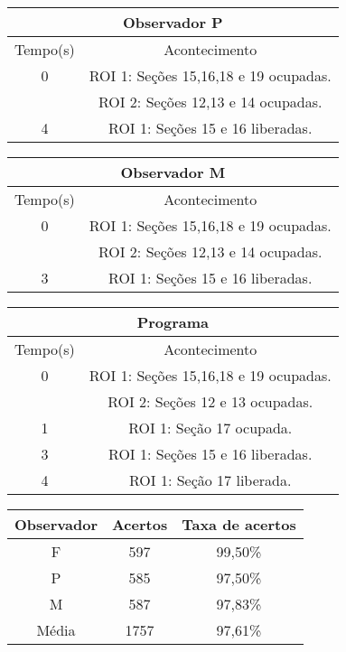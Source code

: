 \begin{center}
\begin{tabular}{|c||c|}
\hline
\multicolumn{2}{|c|}{Observador P}  \\ \hline \hline
Tempo(s) & Acontecimento \\ \hline
0 & ROI 1: Seções 15,16,18 e 19 ocupadas. \\
 & ROI 2: Seções 12,13 e 14 ocupadas. \\ \hline
4 & ROI 1: Seções 15 e 16 liberadas. \\
\hline
\end{tabular}
\end{center}

\begin{center}
\begin{tabular}{|c||c|}
\hline
\multicolumn{2}{|c|}{Observador M}  \\ \hline \hline
Tempo(s) & Acontecimento \\ \hline
0 & ROI 1: Seções 15,16,18 e 19 ocupadas. \\
 & ROI 2: Seções 12,13 e 14 ocupadas. \\ \hline
3 & ROI 1: Seções 15 e 16 liberadas. \\
\hline
\end{tabular}
\end{center}

\begin{center}
\begin{tabular}{|c||c|}
\hline
\multicolumn{2}{|c|}{Programa}  \\ \hline \hline
Tempo(s) & Acontecimento \\ \hline
0 & ROI 1: Seções 15,16,18 e 19 ocupadas. \\
 & ROI 2: Seções 12 e 13 ocupadas. \\ \hline
1 & ROI 1: Seção 17 ocupada. \\ \hline
3 & ROI 1: Seções 15 e 16 liberadas. \\ \hline
4 & ROI 1: Seção 17 liberada. \\
\hline
\end{tabular}
\end{center}

\begin{center}
\begin{tabular}{|c||c||c|}
\hline
Observador & Acertos & Taxa de acertos \\ \hline
F & 597 & 99,50\% \\  \hline
P & 585 & 97,50\% \\ \hline
M & 587 & 97,83\% \\ \hline
Média & 1757 & 97,61\% \\
\hline
\end{tabular}
\end{center}

